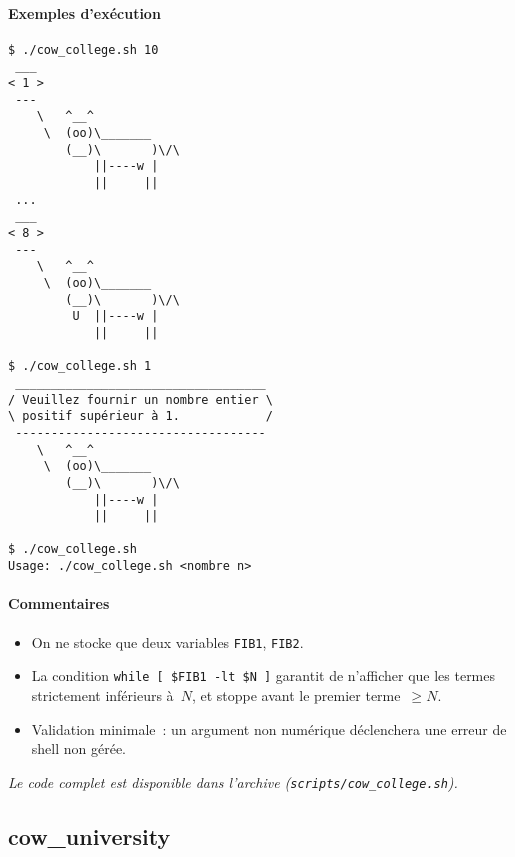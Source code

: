 \documentclass[a4paper,french,11pt]{article}
\begin{document}
\paragraph{Exemples d’exécution}
\begin{verbatim}
$ ./cow_college.sh 10
 ___
< 1 >
 ---
    \   ^__^
     \  (oo)\_______
        (__)\       )\/\
            ||----w |
            ||     ||
 ...
 ___
< 8 >
 ---
    \   ^__^
     \  (oo)\_______
        (__)\       )\/\
         U  ||----w |
            ||     ||

$ ./cow_college.sh 1
 ___________________________________
/ Veuillez fournir un nombre entier \
\ positif supérieur à 1.            /
 -----------------------------------
    \   ^__^
     \  (oo)\_______
        (__)\       )\/\
            ||----w |
            ||     ||

$ ./cow_college.sh
Usage: ./cow_college.sh <nombre n>
\end{verbatim}

\paragraph{Commentaires}  
\begin{itemize}
  \item On ne stocke que deux variables \texttt{FIB1}, \texttt{FIB2}.
  \item La condition 
    \texttt{while [ \$FIB1 -lt \$N ]} garantit de n’afficher que les termes strictement inférieurs à $N$, 
    et stoppe avant le premier terme $\ge N$.
  \item Validation minimale : un argument non numérique déclenchera une erreur de shell non gérée.
\end{itemize}

\medskip
\noindent\emph{Le code complet est disponible dans l’archive (\texttt{scripts/cow\_college.sh}).}

\newpage

\subsection{cow\_university}
\end{document}
